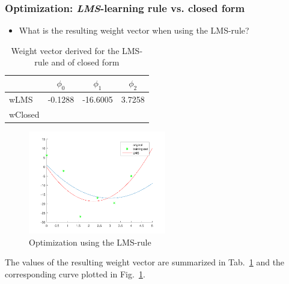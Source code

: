 \documentclass[a4]{article}
\begin{document}
\subsubsection{Optimization: \emph{LMS}-learning rule vs. closed form}
%
%
\begin{itemize}
	\item What is the resulting weight vector when using the LMS-rule?
\end{itemize}
\begin{table} [tbp!]
	\caption{Weight vector derived for the LMS-rule and of closed form}
	\centering
	\label{table:wLMS}
	\begin{tabular}{l c c c}
		\toprule
		& $\phi_0$ & $\phi_1$ & $\phi_2$ \\ 
		\midrule
		wLMS & -0.1288 & -16.6005 & 3.7258 \\ %
		wClosed &  &  &\\
		\bottomrule
	\end{tabular}
\end{table}
\begin{figure}[!h]
	\centering
	\includegraphics[width=6cm]{../figures/LMS.pdf}
	\caption{Optimization using the LMS-rule}
	\label{fig:122_LMS}
\end{figure}
The values of the resulting weight vector are summarized in Tab.~\ref{table:wLMS} and the corresponding curve plotted in Fig.~\ref{fig:122_LMS}.
\end{document}
